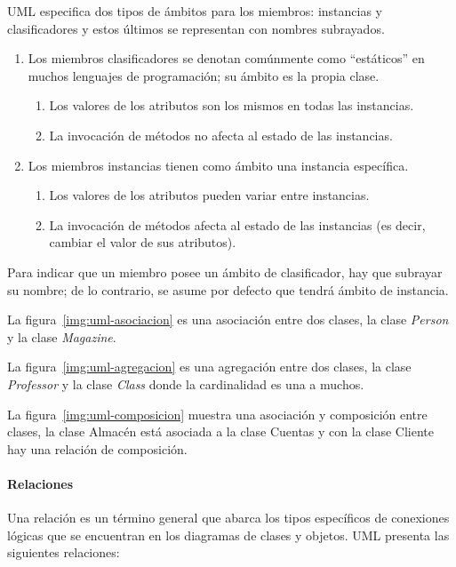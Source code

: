 UML especifica dos tipos de ámbitos para los miembros: instancias y clasificadores y estos últimos se representan con nombres subrayados.

\begin{enumerate}
    \item Los miembros clasificadores se denotan comúnmente como “estáticos” en muchos lenguajes de programación; su ámbito es la propia clase.
    \begin{enumerate}
        \item Los valores de los atributos son los mismos en todas las instancias.
        \item La invocación de métodos no afecta al estado de las instancias.
    \end{enumerate}
    \item Los miembros instancias tienen como ámbito una instancia específica.
\begin{enumerate}
    \item Los valores de los atributos pueden variar entre instancias.
    \item La invocación de métodos afecta al estado de las instancias (es decir, cambiar el valor de sus atributos).
\end{enumerate}
\end{enumerate}
Para indicar que un miembro posee un ámbito de clasificador, hay que subrayar su nombre; de lo contrario, se asume por defecto que tendrá ámbito de instancia.



La figura~\ref{img:uml-asociacion} es una asociación entre dos clases, la clase \textit{Person} y la clase \textit{Magazine}.

La figura~\ref{img:uml-agregacion} es una agregación entre dos clases, la clase \textit{Professor} y la clase \textit{Class} donde la cardinalidad es una a muchos.

La figura~\ref{img:uml-composicion} muestra una  asociación y composición entre clases, la clase Almacén está asociada a la clase Cuentas y con la clase Cliente hay una relación de composición.


\paragraph*{Relaciones}
Una relación es un término general que abarca los tipos específicos de conexiones lógicas que se encuentran en los diagramas de clases y objetos. UML presenta las siguientes relaciones:

